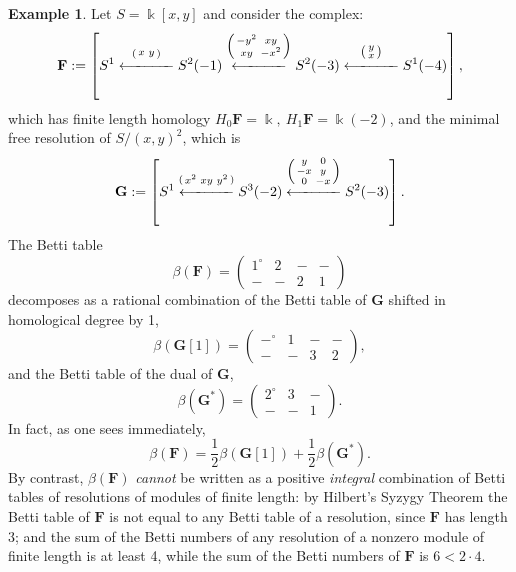\documentclass[12pt]{amsart}
\theoremstyle{definition}
\newtheorem{example}[lemma]{Example}
\theoremstyle{remark}
\newcommand{\kk}{\Bbbk}
\newcommand{\bG}{\mathbf{G}}
\newcommand{\FF}{\mathbf{F}}
\begin{document}
\begin{example}
Let $S=\kk[x,y]$ and consider the complex:
\[
\FF := \left[S^1\overset{\left(\begin{smallmatrix}x&y\end{smallmatrix}\right)}{\xlongleftarrow{\hspace*{1.1cm}}} S^2(-1)\overset{\left(\begin{smallmatrix}-y^2&xy\\xy&-x^2\end{smallmatrix}\right)}{\xlongleftarrow{\hspace*{1.1cm}}} S^2(-3)\overset{\left(\begin{smallmatrix}y\\x\end{smallmatrix}\right)}{\xlongleftarrow{\hspace*{1.1cm}}} S^1(-4)\right],
\]
which has finite length homology $H_{0}\FF = \kk,\ H_{1}\FF = \kk(-2)$, and the minimal free resolution of $S/(x,y)^{2}$, which 
is
\[
\bG := 
\left[S^1\overset{\left(\begin{smallmatrix}x^{2}&xy&y^{2}\end{smallmatrix}\right)}
{\xlongleftarrow{\hspace*{1.1cm}}} 
S^3(-2)\overset{\left(\begin{smallmatrix}y&0\\-x&y\\0&-x\end{smallmatrix}\right)}{\xlongleftarrow{\hspace*{1.1cm}}} S^2(-3)\right].
\]
The Betti table
$$
\beta(\FF)=\begin{pmatrix} 1^\circ&2&-&-\\-&-&2&1\end{pmatrix}
$$
decomposes as a rational combination of the Betti table of $\bG$ shifted in 
homological degree by 1,
$$
\beta(\bG[1]) =\begin{pmatrix} -^{\circ}&1&-&-\\-&-&3&2\end{pmatrix},
$$
and the Betti table of the dual of $\bG$, 
$$
\beta(\bG^{*}) = \begin{pmatrix} 2^\circ&3&-\\-&-&1\end{pmatrix}.
$$
In fact, as one sees immediately,
\[
\beta(\FF)=
\frac{1}{2}\beta(\bG[1])
+
\frac{1}{2}\beta(\bG^{*}).
\]
By contrast, $\beta(\FF)$ \emph{cannot} be written as a positive \emph{integral} combination of Betti tables of resolutions of modules of finite length: by Hilbert's Syzygy Theorem the Betti table of $\FF$  is not equal to any Betti table of a resolution, since $\FF$ has length 3; and the sum of the Betti numbers of any resolution of a nonzero module of finite length is at least 4, while the sum of the Betti numbers of $\FF$ is $6<2\cdot 4$.
\end{example}
\end{document}
